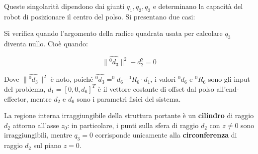 \documentclass[11pt, a4paper]{article}
\begin{document}
\vspace{1em}


\begin{par}
\begin{flushleft}
Queste singolarità dipendono dai giunti $q_1 ,q_2 ,q_3$ e determinano la capacità del robot di posizionare il centro del polso. Si presentano due casi:
\end{flushleft}
\end{par}


\begin{par}
\begin{flushleft}
Si verifica quando l'argomento della radice quadrata usata per calcolare $q_3$ diventa nullo. Cioè quando:
\end{flushleft}
\end{par}

\[
    \|\hat{^0 d_3 } {\|}^2 -d_2^2 =0
\]

\begin{par}
\begin{flushleft}
Dove $\|\hat{^0 d_3 } {\|}^2$ è noto, poiché $\hat{^0 d_3 } =^0 d_6 -^0 R_6 \cdot d_1$, i valori $^0 d_6$ e $^0 R_6$ sono gli input del problema, $d_1 =[0,0,d_6 ]^T$ è il vettore costante di offset dal polso all'end-effector, mentre $d_2$ e $d_6$ sono i parametri fisici del sistema.
\end{flushleft}
\end{par}

\begin{par}
\begin{flushleft}
La regione interna irraggiungibile della struttura portante è un \textbf{cilindro} di raggio $d_2$ attorno all'asse $z_0$: in particolare, i punti sulla sfera di raggio $d_2$ con $z \neq 0$ sono irraggiungibili, mentre $q_3 = 0$ corrisponde unicamente alla \textbf{circonferenza} di raggio $d_2$ sul piano $z = 0$.
\end{flushleft}
\end{par}
\end{document}
